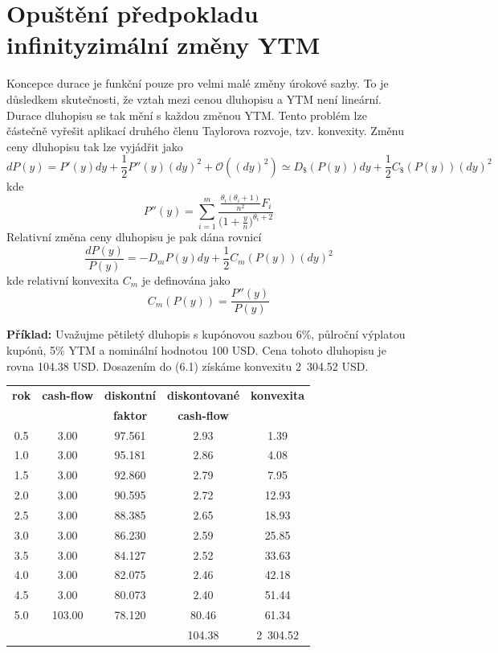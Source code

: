 \documentclass[a4paper]{book}
\begin{document}
\section{Opuštění předpokladu infinityzimální změny YTM}

Koncepce durace je funkční pouze pro velmi malé změny úrokové sazby. To je důsledkem skutečnosti, že vztah mezi cenou dluhopisu a YTM není lineární. Durace dluhopisu se tak mění s každou změnou YTM. Tento problém lze částečně vyřešit aplikací druhého členu Taylorova rozvoje, tzv. konvexity. Změnu ceny dluhopisu tak lze vyjádřit jako
\begin{equation*}
dP(y) = P'(y)dy + \frac{1}{2}P''(y) (dy)^2 + \mathcal{O}((dy)^2) \simeq D_\$(P(y))dy + \frac{1}{2}C_\$(P(y))(dy)^2
\end{equation*}
kde
\begin{equation}
P''(y) = \sum_{i=1}^m \frac{\frac{\theta_i(\theta_i + 1)}{n^2}F_i}{\Big(1 + \frac{y}{n}\Big)^{\theta_i + 2}}
\end{equation}
Relativní změna ceny dluhopisu je pak dána rovnicí
\begin{equation*}
\frac{dP(y)}{P(y)} = -D_m P(y)dy + \frac{1}{2}C_m(P(y))(dy)^2
\end{equation*}
kde relativní konvexita $C_m$ je definována jako
\begin{equation*}
C_m(P(y)) = \frac{P''(y)}{P(y)}
\end{equation*}

\noindent \textbf{Příklad:} Uvažujme pětiletý dluhopis s kupónovou sazbou 6\%, půlroční výplatou kupónů, 5\% YTM a nominální hodnotou 100 USD. Cena tohoto dluhopisu je rovna 104.38 USD. Dosazením do (6.1) získáme konvexitu 2~304.52 USD.
\begin{center}
\begin{tabular}{c c c c c}
\textbf{rok} & \textbf{cash-flow} & \textbf{diskontní} & \textbf{diskontované} & \textbf{konvexita}\\
             &                    & \textbf{faktor}    & \textbf{cash-flow}    &  \\
\hline
0.5 & 3.00   & 97.561 &   2.93 &  1.39 \\
1.0 & 3.00   & 95.181 &   2.86 &  4.08 \\
1.5 & 3.00   & 92.860 &   2.79 &  7.95 \\
2.0 & 3.00   & 90.595 &   2.72 & 12.93 \\
2.5 & 3.00   & 88.385 &   2.65 & 18.93 \\
3.0 & 3.00   & 86.230 &   2.59 & 25.85 \\
3.5 & 3.00   & 84.127 &   2.52 & 33.63 \\
4.0 & 3.00   & 82.075 &   2.46 & 42.18 \\
4.5 & 3.00   & 80.073 &   2.40 & 51.44 \\
5.0 & 103.00 & 78.120 &  80.46 & 61.34 \\
\hline
    &        &        & 104.38 & 2~304.52 \\
\end{tabular}
\end{center}
\end{document}
